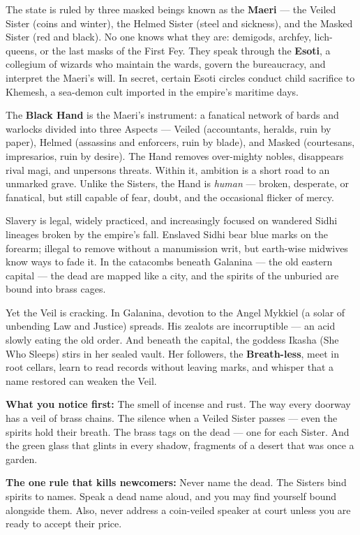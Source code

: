 \begin{tcolorbox}[colback=black!3,colframe=blue!60!black,title={Theme \& Atmosphere},breakable]
The state is ruled by three masked beings known as the \textbf{Maeri} --- the Veiled Sister (coins and winter), the Helmed Sister (steel and sickness), and the Masked Sister (red and black). No one knows what they are: demigods, archfey, lich-queens, or the last masks of the First Fey. They speak through the \textbf{Esoti}, a collegium of wizards who maintain the wards, govern the bureaucracy, and interpret the Maeri's will. In secret, certain Esoti circles conduct child sacrifice to Khemesh, a sea-demon cult imported in the empire's maritime days.

The \textbf{Black Hand} is the Maeri's instrument: a fanatical network of bards and warlocks divided into three Aspects --- Veiled (accountants, heralds, ruin by paper), Helmed (assassins and enforcers, ruin by blade), and Masked (courtesans, impresarios, ruin by desire). The Hand removes over-mighty nobles, disappears rival magi, and unpersons threats. Within it, ambition is a short road to an unmarked grave. Unlike the Sisters, the Hand is \emph{human} --- broken, desperate, or fanatical, but still capable of fear, doubt, and the occasional flicker of mercy.

Slavery is legal, widely practiced, and increasingly focused on wandered Sidhi lineages broken by the empire's fall. Enslaved Sidhi bear blue marks on the forearm; illegal to remove without a manumission writ, but earth-wise midwives know ways to fade it. In the catacombs beneath Galanina --- the old eastern capital --- the dead are mapped like a city, and the spirits of the unburied are bound into brass cages.

Yet the Veil is cracking. In Galanina, devotion to the Angel Mykkiel (a solar of unbending Law and Justice) spreads. His zealots are incorruptible --- an acid slowly eating the old order. And beneath the capital, the goddess Ikasha (She Who Sleeps) stirs in her sealed vault. Her followers, the \textbf{Breath-less}, meet in root cellars, learn to read records without leaving marks, and whisper that a name restored can weaken the Veil.

\vspace{2mm}
\textbf{What you notice first:} The smell of incense and rust. The way every doorway has a veil of brass chains. The silence when a Veiled Sister passes --- even the spirits hold their breath. The brass tags on the dead --- one for each Sister. And the green glass that glints in every shadow, fragments of a desert that was once a garden.

\textbf{The one rule that kills newcomers:} Never name the dead. The Sisters bind spirits to names. Speak a dead name aloud, and you may find yourself bound alongside them. Also, never address a coin-veiled speaker at court unless you are ready to accept their price.
\end{tcolorbox}

